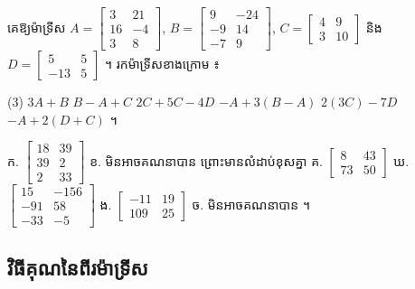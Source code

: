 \begin{pro}
គេឱ្យម៉ាទ្រីស $A = \begin{bmatrix} 3 & 21\\ 16 & -4\\ 3 & 8 \end{bmatrix}$, $B = \begin{bmatrix} 9 & -24\\ -9 & 14\\ -7 & 9 \end{bmatrix}$, $C = \begin{bmatrix} 4 & 9\\ 3 & 10 \end{bmatrix}$ និង $D = \begin{bmatrix} 5 & 5\\ -13 & 5 \end{bmatrix}$ ។ រកម៉ាទ្រីសខាងក្រោម ៖
\begin{tasks}(3)
  \task $3A + B$
  \task $B - A + C$
  \task $2C + 5C - 4D$
  \task $-A + 3(B - A)$
  \task $2(3C) - 7D$
  \task $-A + 2(D + C)$ ។
\end{tasks}
\ans
ក. $\begin{bmatrix} 18 & 39\\ 39 & 2\\ 2 & 33 \end{bmatrix}$ \quad ខ. មិនអាចគណនាបាន ព្រោះមានលំដាប់ខុសគ្នា \quad គ. $\begin{bmatrix} 8 & 43\\ 73 & 50 \end{bmatrix}$ \quad ឃ. $\begin{bmatrix} 15 & -156\\ -91 & 58\\ -33 & -5 \end{bmatrix}$ \quad ង. $\begin{bmatrix} -11 & 19\\ 109 & 25 \end{bmatrix}$ \quad ច. មិនអាចគណនាបាន ។
\end{pro}

\subsection{វិធីគុណនៃពីរម៉ាទ្រីស}


